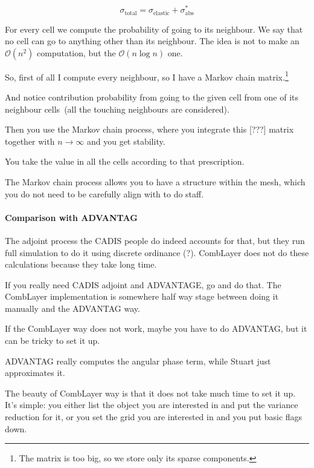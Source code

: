 \begin{description}
$$
\sigma_\text{total} = \sigma_\text{elastic} + \sigma_\text{abs}^*
$$

For every cell we compute the probability of going to its neighbour. We say that no cell can go to anything other than its neighbour.
The idea is not to make an $\mathcal{O}(n^2)$ computation, but the $\mathcal{O}(n\log{}n)$ one.

So, first of all I compute every neighbour, so I have a Markov chain matrix.\footnote{The matrix is too big, so we store only its sparse components.} %

And notice contribution probability from going to the given cell from one of its neighbour cells~(all the touching neighbours are considered).

Then you use the Markov chain process, where you integrate this [\alert{???}] matrix together with $n\to\infty$ and you get stability.

You take the value in all the cells according to that prescription.


The Markov chain process allows you to have a structure within the mesh, which you do not need to be carefully align with to do staff.

\paragraph{Comparison with ADVANTAG}

The adjoint process the CADIS people do indeed accounts for that, but they run full simulation to do it using discrete ordinance (?).
CombLayer does not do these calculations because they take long time.

If you really need CADIS adjoint and ADVANTAGE, go and do that.
The CombLayer implementation is somewhere half way stage between doing it manually and the ADVANTAG way.


If the CombLayer way does not work, maybe you have to do ADVANTAG, but it can be tricky to set it up.

ADVANTAG really computes the angular phase term, while Stuart just approximates it.

The beauty of CombLayer way is that it does not take much time to set it up. It's simple: you either list the object you are interested in and put the variance reduction for it,
or you set the grid you are interested in and you put basic flags down.


\end{description}
